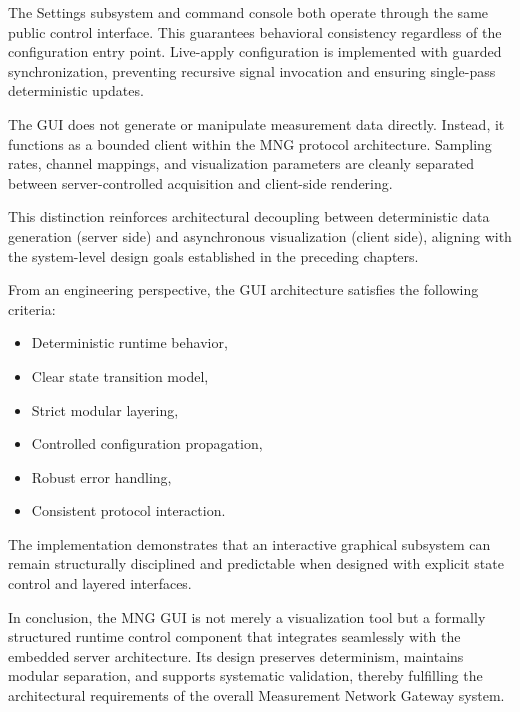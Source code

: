 The Settings subsystem and command console both operate through the same public control interface. This guarantees behavioral consistency regardless of the configuration entry point. Live-apply configuration is implemented with guarded synchronization, preventing recursive signal invocation and ensuring single-pass deterministic updates.

The GUI does not generate or manipulate measurement data directly. Instead, it functions as a bounded client within the MNG protocol architecture. Sampling rates, channel mappings, and visualization parameters are cleanly separated between server-controlled acquisition and client-side rendering.

This distinction reinforces architectural decoupling between deterministic data generation (server side) and asynchronous visualization (client side), aligning with the system-level design goals established in the preceding chapters.

From an engineering perspective, the GUI architecture satisfies the following criteria:

\begin{itemize}
	\item Deterministic runtime behavior,
	\item Clear state transition model,
	\item Strict modular layering,
	\item Controlled configuration propagation,
	\item Robust error handling,
	\item Consistent protocol interaction.
\end{itemize}

The implementation demonstrates that an interactive graphical subsystem can remain structurally disciplined and predictable when designed with explicit state control and layered interfaces.

In conclusion, the MNG GUI is not merely a visualization tool but a formally structured runtime control component that integrates seamlessly with the embedded server architecture. Its design preserves determinism, maintains modular separation, and supports systematic validation, thereby fulfilling the architectural requirements of the overall Measurement Network Gateway system.

